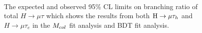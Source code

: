 \begin{figure}[htbp] 
     \centering
     \\
     \caption[The expected and observed limits on $H \to \mu \tau$ analysis]{The expected and observed 95\% CL limits on branching ratio of total $H \to \mu\tau$ which shows the results from both $\mathrm{H}\to \mu\tau_{h}$ and $H \to \mu\tau_{e}$ in the $M_{col}$ fit analysis and BDT fit analysis.}
     \label{fig:cutbasedpostfit}
\end{figure}




